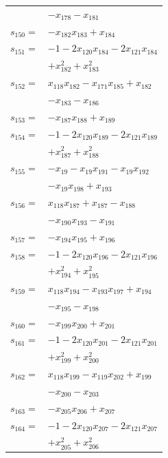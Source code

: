 \begin{longtable}{@{}r@{\;}l@{}}
 & \(\displaystyle -x_{178} -x_{181}\) \\[3pt]
\(s_{150}=\) & \(\displaystyle -x_{182}x_{183} +x_{184}\) \\[3pt]
\(s_{151}=\) & \(\displaystyle -1 -2x_{120}x_{184} -2x_{121}x_{184}\) \\
 & \(\displaystyle +x_{182}^{2} +x_{183}^{2}\) \\[3pt]
\(s_{152}=\) & \(\displaystyle x_{118}x_{182} -x_{171}x_{185} +x_{182}\) \\
 & \(\displaystyle -x_{183} -x_{186}\) \\[3pt]
\(s_{153}=\) & \(\displaystyle -x_{187}x_{188} +x_{189}\) \\[3pt]
\(s_{154}=\) & \(\displaystyle -1 -2x_{120}x_{189} -2x_{121}x_{189}\) \\
 & \(\displaystyle +x_{187}^{2} +x_{188}^{2}\) \\[3pt]
\(s_{155}=\) & \(\displaystyle -x_{19} -x_{19}x_{191} -x_{19}x_{192}\) \\
 & \(\displaystyle -x_{19}x_{198} +x_{193}\) \\[3pt]
\(s_{156}=\) & \(\displaystyle x_{118}x_{187} +x_{187} -x_{188}\) \\
 & \(\displaystyle -x_{190}x_{193} -x_{191}\) \\[3pt]
\(s_{157}=\) & \(\displaystyle -x_{194}x_{195} +x_{196}\) \\[3pt]
\(s_{158}=\) & \(\displaystyle -1 -2x_{120}x_{196} -2x_{121}x_{196}\) \\
 & \(\displaystyle +x_{194}^{2} +x_{195}^{2}\) \\[3pt]
\(s_{159}=\) & \(\displaystyle x_{118}x_{194} -x_{193}x_{197} +x_{194}\) \\
 & \(\displaystyle -x_{195} -x_{198}\) \\[3pt]
\(s_{160}=\) & \(\displaystyle -x_{199}x_{200} +x_{201}\) \\[3pt]
\(s_{161}=\) & \(\displaystyle -1 -2x_{120}x_{201} -2x_{121}x_{201}\) \\
 & \(\displaystyle +x_{199}^{2} +x_{200}^{2}\) \\[3pt]
\(s_{162}=\) & \(\displaystyle x_{118}x_{199} -x_{119}x_{202} +x_{199}\) \\
 & \(\displaystyle -x_{200} -x_{203}\) \\[3pt]
\(s_{163}=\) & \(\displaystyle -x_{205}x_{206} +x_{207}\) \\[3pt]
\(s_{164}=\) & \(\displaystyle -1 -2x_{120}x_{207} -2x_{121}x_{207}\) \\
 & \(\displaystyle +x_{205}^{2} +x_{206}^{2}\) \\[3pt]

\end{longtable}

